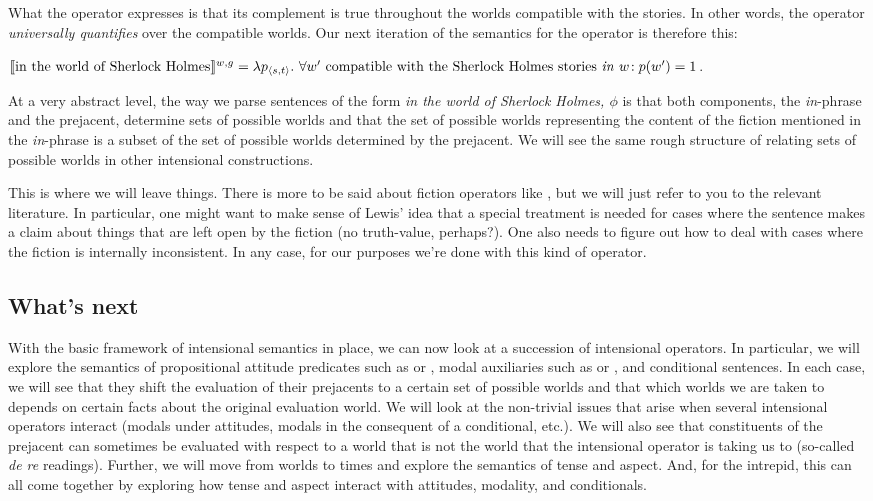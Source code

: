 What the operator  expresses is that
its complement is true throughout the worlds compatible with the stories. In
other words, the operator \emph{universally quantifies} over the compatible
worlds. Our next iteration of the semantics for the operator is therefore this:

\ex $\llbracket \mbox{in the world of Sherlock Holmes} \rrbracket^{w,g} =\\
\lambda p_{\langle s,t \rangle}.\ \forall w' \mbox{ compatible with the Sherlock Holmes stories \emph{in} } w\!:\\
p(w') = 1$. \xe

At a very abstract level, the way we parse sentences of the form \emph{in the
  world of Sherlock Holmes, $\phi$} is that both components, the
\emph{in}-phrase and the prejacent, determine sets of possible worlds and that
the set of possible worlds representing the content of the fiction mentioned in
the \emph{in}-phrase is a subset of the set of possible worlds determined by the
prejacent. We will see the same rough structure of relating sets of possible
worlds in other intensional constructions.

This is where we will leave things. There is more to be said about fiction
operators like , but we will just
refer to you to the relevant literature. In particular, one might want to make
sense of Lewis' idea that a special treatment is needed for cases where the
sentence makes a claim about things that are left open by the fiction (no
truth-value, perhaps?). One also needs to figure out how to deal with cases
where the fiction is internally inconsistent. In any case, for our purposes
we're done with this kind of operator.

\subsection{What's next}
\label{sec:next}

With the basic framework of intensional semantics in place, we can now look at a
succession of intensional operators. In particular, we will explore the
semantics of propositional attitude predicates such as  or
, modal auxiliaries such as  or
, and conditional sentences. In each case, we will see that
they shift the evaluation of their prejacents to a certain set of possible
worlds and that which worlds we are taken to depends on certain facts about the
original evaluation world. We will look at the non-trivial issues that arise
when several intensional operators interact (modals under attitudes, modals in
the consequent of a conditional, etc.). We will also see that constituents of
the prejacent can sometimes be evaluated with respect to a world that is not the
world that the intensional operator is taking us to (so-called \emph{de re}
readings). Further, we will move from worlds to times and explore the semantics
of tense and aspect. And, for the intrepid, this can all come together by
exploring how tense and aspect interact with attitudes, modality, and
conditionals.

